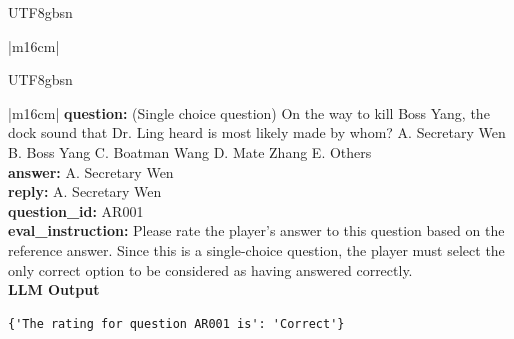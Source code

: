 \documentclass[11pt]{article}
\begin{document}
{\begin{CJK}{UTF8}{gbsn}
\begin{table}[ht!]
\begin{minipage}[t]{\linewidth}
\begin{tabular}{|m{16cm}|}
\hline
\end{tabular}
\end{minipage}

\end{table}
\end{CJK}



\begin{CJK}{UTF8}{gbsn}
\begin{table}[ht!]
\centering
\begin{minipage}[t]{\linewidth}
\begin{tabular}{|m{16cm}|}
 \textbf{  question:} \small (Single choice question) On the way to kill Boss Yang, the dock sound that Dr. Ling heard is most likely made by whom? A. Secretary Wen B. Boss Yang C. Boatman Wang D. Mate Zhang E. Others\\
  \textbf{  answer:} \small A. Secretary Wen\\
  \textbf{  reply:} \small A. Secretary Wen\\
  \textbf{  question\_id:} \small AR001\\
    \textbf{  eval\_instruction:} \small Please rate the player's answer to this question based on the reference answer. Since this is a single-choice question, the player must select the only correct option to be considered as having answered correctly.\\
\hline
{}  \textbf{LLM Output}  \\
\hline
\begin{minipage}[t]{\linewidth}
\small\begin{verbatim}
{'The rating for question AR001 is': 'Correct'}


\end{verbatim}
\end{minipage}
\end{tabular}
\end{minipage}
\end{table}
\end{CJK}}
\end{document}
